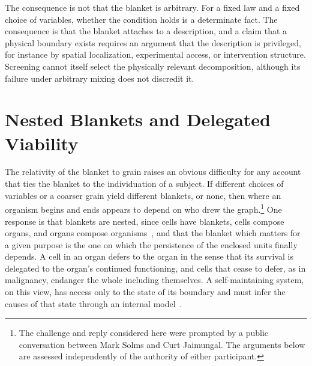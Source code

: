 \documentclass[11pt]{article}
\theoremstyle{definition}
\begin{document}
The consequence is not that the blanket is arbitrary. For a fixed law and a fixed choice of variables, whether the condition holds is a determinate fact. The consequence is that the blanket attaches to a description, and a claim that a physical boundary exists requires an argument that the description is privileged, for instance by spatial localization, experimental access, or intervention structure. Screening cannot itself select the physically relevant decomposition, although its failure under arbitrary mixing does not discredit it.

\section{Nested Blankets and Delegated Viability}

The relativity of the blanket to grain raises an obvious difficulty for any account that ties the blanket to the individuation of a subject. If different choices of variables or a coarser grain yield different blankets, or none, then where an organism begins and ends appears to depend on who drew the graph.\footnote{The challenge and reply considered here were prompted by a public conversation between Mark Solms and Curt Jaimungal. The arguments below are assessed independently of the authority of either participant.} One response is that blankets are nested, since cells have blankets, cells compose organs, and organs compose organisms~\cite{kirchhoff2018}, and that the blanket which matters for a given purpose is the one on which the persistence of the enclosed units finally depends. A cell in an organ defers to the organ in the sense that its survival is delegated to the organ's continued functioning, and cells that cease to defer, as in malignancy, endanger the whole including themselves. A self-maintaining system, on this view, has access only to the state of its boundary and must infer the causes of that state through an internal model~\cite{solms2021}.
\end{document}
